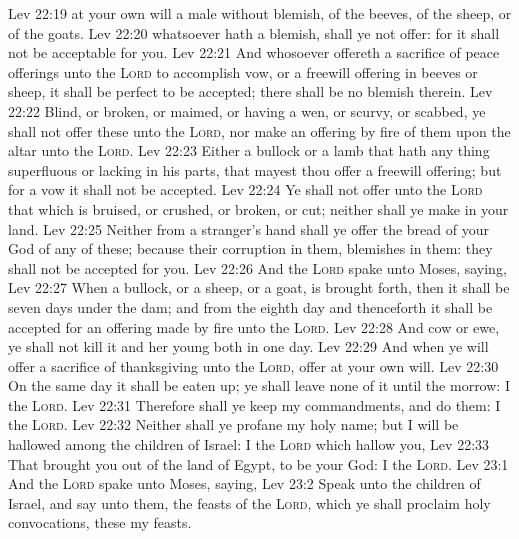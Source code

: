 \vs Lev 22:19  at your own will a male without blemish, of the beeves, of the sheep, or of the goats.
\vs Lev 22:20  whatsoever hath a blemish,  shall ye not offer: for it shall not be acceptable for you.
\vs Lev 22:21 And whosoever offereth a sacrifice of peace offerings unto the \textsc{Lord} to accomplish  vow, or a freewill offering in beeves or sheep, it shall be perfect to be accepted; there shall be no blemish therein.
\vs Lev 22:22 Blind, or broken, or maimed, or having a wen, or scurvy, or scabbed, ye shall not offer these unto the \textsc{Lord}, nor make an offering by fire of them upon the altar unto the \textsc{Lord}.
\vs Lev 22:23 Either a bullock or a lamb that hath any thing superfluous or lacking in his parts, that mayest thou offer  a freewill offering; but for a vow it shall not be accepted.
\vs Lev 22:24 Ye shall not offer unto the \textsc{Lord} that which is bruised, or crushed, or broken, or cut; neither shall ye make  in your land.
\vs Lev 22:25 Neither from a stranger's hand shall ye offer the bread of your God of any of these; because their corruption  in them,  blemishes  in them: they shall not be accepted for you.
\vs Lev 22:26 And the \textsc{Lord} spake unto Moses, saying,
\vs Lev 22:27 When a bullock, or a sheep, or a goat, is brought forth, then it shall be seven days under the dam; and from the eighth day and thenceforth it shall be accepted for an offering made by fire unto the \textsc{Lord}.
\vs Lev 22:28 And  cow or ewe, ye shall not kill it and her young both in one day.
\vs Lev 22:29 And when ye will offer a sacrifice of thanksgiving unto the \textsc{Lord}, offer  at your own will.
\vs Lev 22:30 On the same day it shall be eaten up; ye shall leave none of it until the morrow: I  the \textsc{Lord}.
\vs Lev 22:31 Therefore shall ye keep my commandments, and do them: I  the \textsc{Lord}.
\vs Lev 22:32 Neither shall ye profane my holy name; but I will be hallowed among the children of Israel: I  the \textsc{Lord} which hallow you,
\vs Lev 22:33 That brought you out of the land of Egypt, to be your God: I  the \textsc{Lord}.
\vs Lev 23:1 And the \textsc{Lord} spake unto Moses, saying,
\vs Lev 23:2 Speak unto the children of Israel, and say unto them,  the feasts of the \textsc{Lord}, which ye shall proclaim  holy convocations,  these  my feasts.
